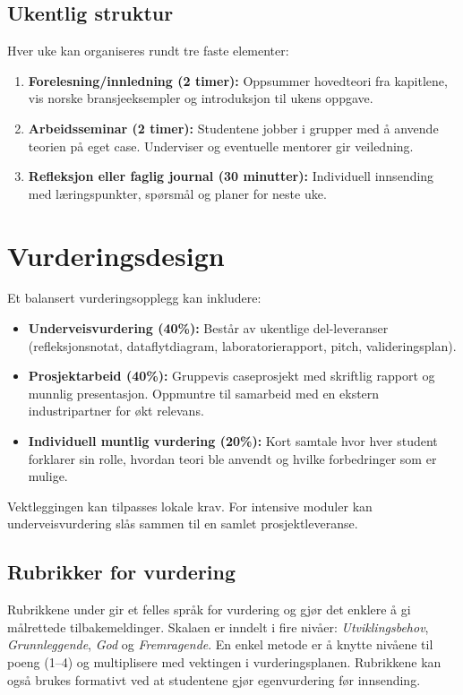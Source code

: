 \subsection{Ukentlig struktur}
Hver uke kan organiseres rundt tre faste elementer:
\begin{enumerate}
    \item \textbf{Forelesning/innledning (2 timer):} Oppsummer hovedteori fra kapitlene, vis norske bransjeeksempler og introduksjon til ukens oppgave.
    \item \textbf{Arbeidsseminar (2 timer):} Studentene jobber i grupper med å anvende teorien på eget case. Underviser og eventuelle mentorer gir veiledning.
    \item \textbf{Refleksjon eller faglig journal (30 minutter):} Individuell innsending med læringspunkter, spørsmål og planer for neste uke.
\end{enumerate}

\section{Vurderingsdesign}
Et balansert vurderingsopplegg kan inkludere:
\begin{itemize}
    \item \textbf{Underveisvurdering (40\%):} Består av ukentlige del-leveranser (refleksjonsnotat, dataflytdiagram, laboratorierapport, pitch, valideringsplan).
    \item \textbf{Prosjektarbeid (40\%):} Gruppevis caseprosjekt med skriftlig rapport og munnlig presentasjon. Oppmuntre til samarbeid med en ekstern industripartner for økt relevans.
    \item \textbf{Individuell muntlig vurdering (20\%):} Kort samtale hvor hver student forklarer sin rolle, hvordan teori ble anvendt og hvilke forbedringer som er mulige.
\end{itemize}
Vektleggingen kan tilpasses lokale krav. For intensive moduler kan underveisvurdering slås sammen til en samlet prosjektleveranse.

\subsection{Rubrikker for vurdering}
Rubrikkene under gir et felles språk for vurdering og gjør det enklere å gi målrettede tilbakemeldinger. Skalaen er inndelt i fire nivåer:
\emph{Utviklingsbehov}, \emph{Grunnleggende}, \emph{God} og \emph{Fremragende}. En enkel metode er å knytte nivåene til poeng (1--4) og multiplisere med vektingen i vurderingsplanen. Rubrikkene kan også brukes formativt ved at studentene gjør egenvurdering før innsending.

